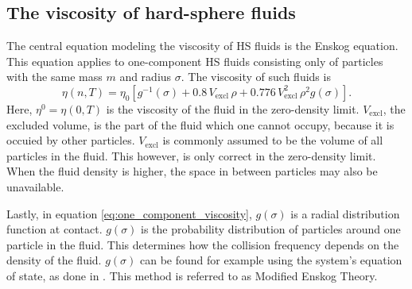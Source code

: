 \subsection{The viscosity of hard-sphere fluids}
The central equation modeling the viscosity of HS fluids is the Enskog equation. 
This equation applies to one-component HS fluids consisting only of particles 
with the same mass $m$ and radius $\sigma$.
The viscosity of such fluids is \cite{ref:pippo:composition_dependence}
\begin{equation}
    \label{eq:one_component_viscosity}
    \eta(n,T) 
        = \eta_0 \left[g^{-1}(\sigma) 
        + 0.8   \, V_{\text{excl}}      \,\rho 
        + 0.776 \, V_{\text{excl}}^2    \,\rho^2 g(\sigma) 
        \right].
\end{equation}
Here, 
$\eta^0 = \eta(0, T)$ is the viscosity of the fluid in the zero-density limit.
$V_{\text{excl}}$, the excluded volume, 
is the part of the fluid which one cannot occupy,
because it is occuied by other particles.
$V_{\text{excl}}$ is commonly assumed to be 
the volume of all particles in the fluid.
This however, is only correct in the zero-density limit. 
When the fluid density is higher, 
the space in between particles may also be unavailable.

Lastly, in equation \eqref{eq:one_component_viscosity}, 
$g(\sigma)$ is a radial distribution function at contact.
$g(\sigma)$ is the probability distribution of particles around one particle in the fluid.
This determines how the collision frequency depends on the density of the fluid.
$g(\sigma)$ can be found for example using the system's equation of state, 
as done in \cite{ref:pippo:composition_dependence}.
This method is referred to as Modified Enskog Theory.


